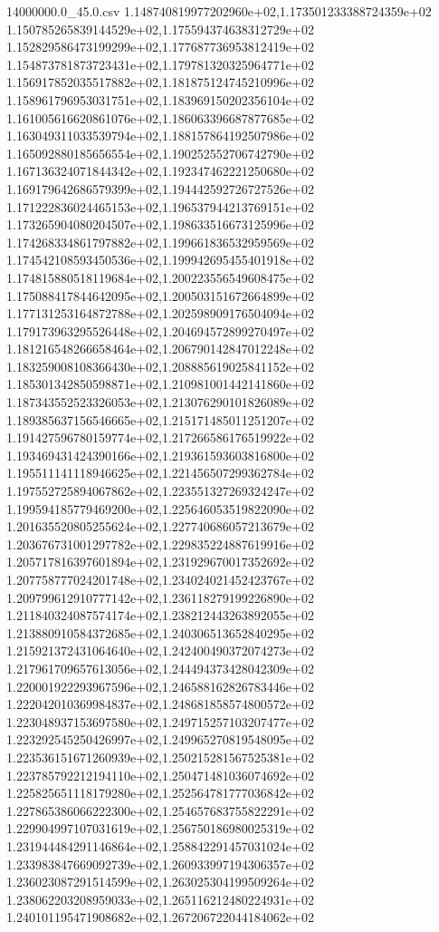 \begin{filecontents*}{14000000.0_45.0.csv}
1.148740819977202960e+02,1.173501233388724359e+02
1.150785265839144529e+02,1.175594374638312729e+02
1.152829586473199299e+02,1.177687736953812419e+02
1.154873781873723431e+02,1.179781320325964771e+02
1.156917852035517882e+02,1.181875124745210996e+02
1.158961796953031751e+02,1.183969150202356104e+02
1.161005616620861076e+02,1.186063396687877685e+02
1.163049311033539794e+02,1.188157864192507986e+02
1.165092880185656554e+02,1.190252552706742790e+02
1.167136324071844342e+02,1.192347462221250680e+02
1.169179642686579399e+02,1.194442592726727526e+02
1.171222836024465153e+02,1.196537944213769151e+02
1.173265904080204507e+02,1.198633516673125996e+02
1.174268334861797882e+02,1.199661836532959569e+02
1.174542108593450536e+02,1.199942695455401918e+02
1.174815880518119684e+02,1.200223556549608475e+02
1.175088417844642095e+02,1.200503151672664899e+02
1.177131253164872788e+02,1.202598909176504094e+02
1.179173963295526448e+02,1.204694572899270497e+02
1.181216548266658464e+02,1.206790142847012248e+02
1.183259008108366430e+02,1.208885619025841152e+02
1.185301342850598871e+02,1.210981001442141860e+02
1.187343552523326053e+02,1.213076290101826089e+02
1.189385637156546665e+02,1.215171485011251207e+02
1.191427596780159774e+02,1.217266586176519922e+02
1.193469431424390166e+02,1.219361593603816800e+02
1.195511141118946625e+02,1.221456507299362784e+02
1.197552725894067862e+02,1.223551327269324247e+02
1.199594185779469200e+02,1.225646053519822090e+02
1.201635520805255624e+02,1.227740686057213679e+02
1.203676731001297782e+02,1.229835224887619916e+02
1.205717816397601894e+02,1.231929670017352692e+02
1.207758777024201748e+02,1.234024021452423767e+02
1.209799612910777142e+02,1.236118279199226890e+02
1.211840324087574174e+02,1.238212443263892055e+02
1.213880910584372685e+02,1.240306513652840295e+02
1.215921372431064640e+02,1.242400490372074273e+02
1.217961709657613056e+02,1.244494373428042309e+02
1.220001922293967596e+02,1.246588162826783446e+02
1.222042010369984837e+02,1.248681858574800572e+02
1.223048937153697580e+02,1.249715257103207477e+02
1.223292545250426997e+02,1.249965270819548095e+02
1.223536151671260939e+02,1.250215281567525381e+02
1.223785792212194110e+02,1.250471481036074692e+02
1.225825651118179280e+02,1.252564781777036842e+02
1.227865386066222300e+02,1.254657683755822291e+02
1.229904997107031619e+02,1.256750186980025319e+02
1.231944484291146864e+02,1.258842291457031024e+02
1.233983847669092739e+02,1.260933997194306357e+02
1.236023087291514599e+02,1.263025304199509264e+02
1.238062203208959033e+02,1.265116212480224931e+02
1.240101195471908682e+02,1.267206722044184062e+02

\end{filecontents*}
